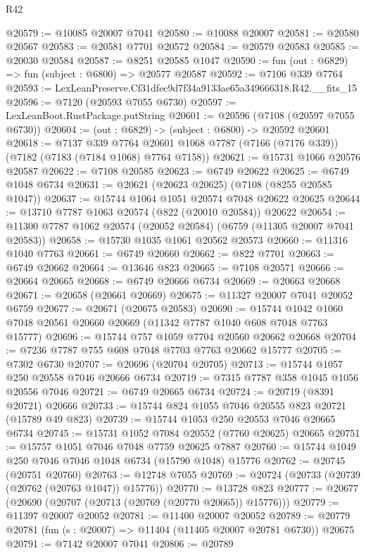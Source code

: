 \begin{lexlean}{R42}
\begin{coremodule}
{@20579 := @10085 @20007 @7041
@20580 := @10088 @20007
@20581 := @20580 @20567
@20583 := @20581 @7701 @20572
@20584 := @20579 @20583
@20585 := @20030 @20584
@20587 := @8251 @20585 @1047
@20590 := fun (out : @6829) => fun (subject : @6800) => @20577 @20587
@20592 := @7106 @339 @7764
@20593 := LexLeanPreserve.Cf31dfec9d7f34a9133ae65a349666318.R42.__fits_15
@20596 := @7120 (@20593 @7055 @6730)
@20597 := LexLeanBoot.RustPackage.putString
@20601 := @20596 (@7108 (@20597 @7055 @6730))
@20604 := (out : @6829) -> (subject : @6800) -> @20592 @20601
@20618 := @7137
    @339
    @7764
    @20601
    @1068
    @7787
    (@7166 (@7176 @339))
    (@7182 (@7183 (@7184 @1068) @7764 @7158))
@20621 := @15731 @1066 @20576 @20587
@20622 := @7108 @20585
@20623 := @6749 @20622
@20625 := @6749 @1048 @6734
@20631 := @20621 (@20623 @20625) (@7108 (@8255 @20585 @1047))
@20637 := @15744 @1064 @1051 @20574 @7048 @20622 @20625
@20644 := @13710 @7787 @1063 @20574 (@822 (@20010 @20584)) @20622
@20654 := @11300 @7787 @1062 @20574 (@20052 @20584) (@6759 (@11305 @20007 @7041 @20583))
@20658 := @15730 @1035 @1061 @20562 @20573
@20660 := @11316 @1040 @7763
@20661 := @6749 @20660
@20662 := @822 @7701
@20663 := @6749 @20662
@20664 := @13646 @823
@20665 := @7108 @20571
@20666 := @20664 @20665
@20668 := @6749 @20666 @6734
@20669 := @20663 @20668
@20671 := @20658 (@20661 @20669)
@20675 := @11327 @20007 @7041 @20052 @6759
@20677 := @20671 (@20675 @20583)
@20690 := @15744 @1042 @1060 @7048 @20561 @20660 @20669 (@11342 @7787 @1040 @608 @7048 @7763 @15777)
@20696 := @15744 @757 @1059 @7704 @20560 @20662 @20668
@20704 := @7236 @7787 @755 @608 @7048 @7703 @7763 @20662 @15777
@20705 := @7302 @6730
@20707 := @20696 (@20704 @20705)
@20713 := @15744 @1057 @250 @20558 @7046 @20666 @6734
@20719 := @7315 @7787 @358 @1045 @1056 @20556 @7046
@20721 := @6749 @20665 @6734
@20724 := @20719 (@8391 @20721) @20666
@20733 := @15744 @824 @1055 @7046 @20555 @823 @20721 (@15789 @49 @823)
@20739 := @15744 @1053 @250 @20553 @7046 @20665 @6734
@20745 := @15731 @1052 @7084 @20552 (@7760 @20625) @20665
@20751 := @15757 @1051 @7046 @7048 @7759 @20625 @7887
@20760 := @15744 @1049 @250 @7046 @7046 @1048 @6734 (@15790 @1048) @15776
@20762 := @20745 (@20751 @20760)
@20763 := @12748 @7055
@20769 := @20724 (@20733 (@20739 (@20762 (@20763 @1047)) @15776))
@20770 := @13728 @823
@20777 := @20677 (@20690 (@20707 (@20713 (@20769 (@20770 @20665)) @15776)))
@20779 := @11397 @20007 @20052
@20781 := @11400 @20007 @20052
@20789 := @20779 @20781 (fun (s : @20007) => @11404 (@11405 @20007 @20781 @6730)) @20675
@20791 := @7142 @20007 @7041
@20806 := @20789
}
\end{coremodule}
\end{lexlean}

